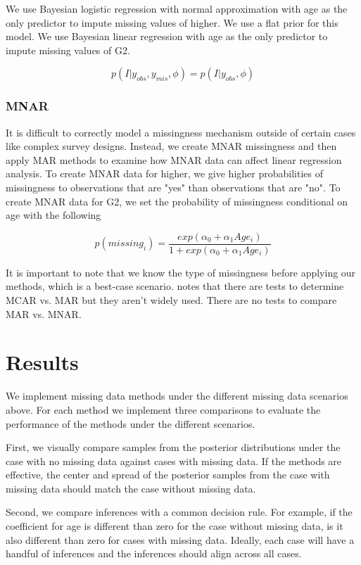 \documentclass[11pt]{article}
\begin{document}
We use Bayesian logistic regression with normal approximation with age as the only predictor to impute missing values of higher. We use a flat prior for this model. We use Bayesian linear regression with age as the only predictor to impute missing values of G2. 

$$p(I|y_{obs}, y_{mis}, \phi) = p(I|y_{obs}, \phi)$$

\subsubsection{MNAR}

It is difficult to correctly model a missingness mechanism outside of certain cases like complex survey designs. Instead, we create MNAR missingness and then apply MAR methods to examine how MNAR data can affect linear regression analysis. To create MNAR data for higher, we give higher probabilities of missingness to observations that are "yes" than observations that are "no". To create MNAR data for G2, we set the probability of missingness conditional on age with the following

$$p(missing_i) = \frac{exp(\alpha_0 + \alpha_1 Age_i)}{1 + exp(\alpha_0 + \alpha_1 Age_i)}$$

It is important to note that we know the type of missingness before applying our methods, which is a best-case scenario. \cite{vanBurren2018} notes that there are tests to determine MCAR vs. MAR but they aren't widely used. There are no tests to compare MAR vs. MNAR.

\section{Results}

We implement missing data methods under the different missing data scenarios above. For each method we implement three comparisons to evaluate the performance of the methods under the different scenarios. 

First, we visually compare samples from the posterior distributions under the case with no missing data against cases with missing data. If the methods are effective, the center and spread of the posterior samples from the case with missing data should match the case without missing data. 

Second, we compare inferences with a common decision rule. For example, if the coefficient for age is different than zero for the case without missing data, is it also different than zero for cases with missing data. Ideally, each case will have a handful of inferences and the inferences should align across all cases. 
\end{document}
